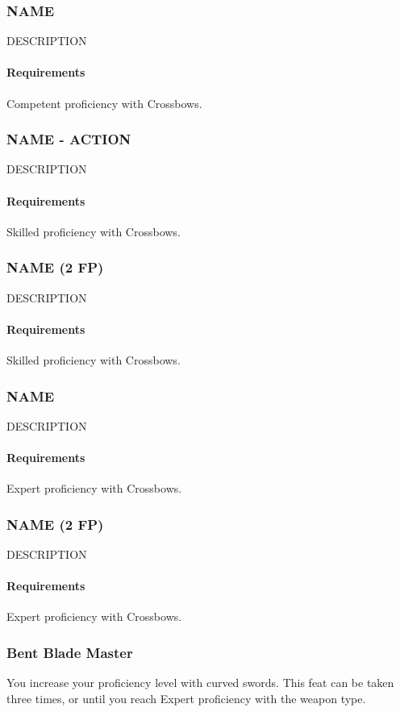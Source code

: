 \subsubsection{NAME} \label{feat::name}
    DESCRIPTION
    \paragraph{Requirements} Competent proficiency with Crossbows.
\subsubsection{NAME - ACTION} \label{feat::name}
    DESCRIPTION
    \paragraph{Requirements} Skilled proficiency with Crossbows.
\subsubsection{NAME (2 FP)} \label{feat::name}
    DESCRIPTION
    \paragraph{Requirements} Skilled proficiency with Crossbows.
\subsubsection{NAME} \label{feat::name}
    DESCRIPTION
    \paragraph{Requirements} Expert proficiency with Crossbows.
\subsubsection{NAME (2 FP)} \label{feat::name}
    DESCRIPTION
    \paragraph{Requirements} Expert proficiency with Crossbows.
\subsubsection{Bent Blade Master} \label{feat::bentblademaster}
    You increase your proficiency level with curved swords.
    This feat can be taken three times, or until you reach Expert proficiency with the weapon type.
